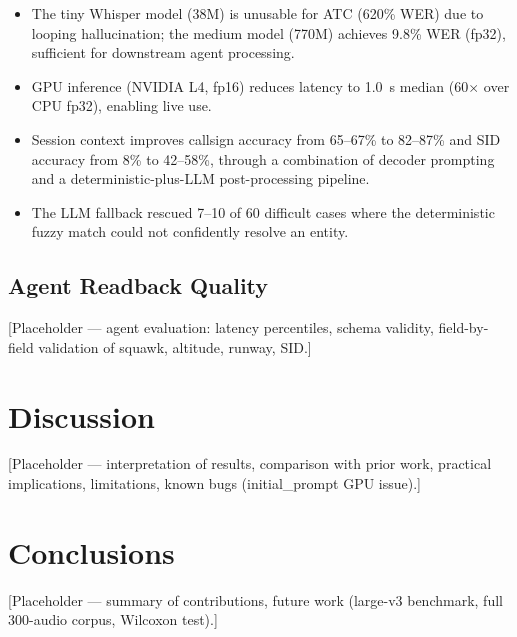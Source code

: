\documentclass[computers,article,submit,moreauthors,pdftex]{Definitions/mdpi}
\begin{document}
\begin{itemize}
    \item The tiny Whisper model (38M) is unusable for ATC (620\% WER) due to
          looping hallucination; the medium model (770M) achieves 9.8\% WER
          (fp32), sufficient for downstream agent processing.
    \item GPU inference (NVIDIA L4, fp16) reduces latency to 1.0~s median
          (60$\times$ over CPU fp32), enabling live use.
    \item Session context improves callsign accuracy from 65--67\% to 82--87\%
          and SID accuracy from 8\% to 42--58\%, through a combination of
          decoder prompting and a deterministic-plus-LLM post-processing
          pipeline.
    \item The LLM fallback rescued 7--10 of 60 difficult cases where the
          deterministic fuzzy match could not confidently resolve an entity.
\end{itemize}

\subsection{Agent Readback Quality}

[Placeholder — agent evaluation: latency percentiles, schema validity,
field-by-field validation of squawk, altitude, runway, SID.]

\section{Discussion}
\label{sec:discussion}

[Placeholder — interpretation of results, comparison with prior work,
practical implications, limitations, known bugs (initial\_prompt GPU issue).]

\section{Conclusions}
\label{sec:conclusions}

[Placeholder — summary of contributions, future work (large-v3 benchmark,
full 300-audio corpus, Wilcoxon test).]



\end{document}
